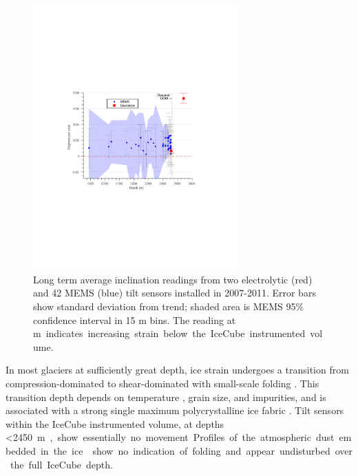 \begin{figure}[!h]
	\centering
    \includegraphics[width=0.7\textwidth]{graphics/geometry/tilt4.pdf}
	\caption{Long term average inclination readings from two electrolytic
      (red) and 42 MEMS (blue) tilt sensors installed in 2007-2011.  Error
      bars show standard deviation from trend; shaded area is MEMS 95\%
      confidence interval in 15 m bins.  The reading at \unit[2540]m
      indicates increasing strain below the IceCube instrumented volume.}
	\label{fig:tilt}
\end{figure}

In most glaciers at sufficiently great depth, ice strain undergoes a
transition from compression-dominated to shear-dominated with small-scale
folding \cite{montagnat14,jansen16}.  This transition depth depends on
temperature \cite{price2002temperature}, grain size, and impurities, and is
associated with a strong single maximum polycrystalline ice fabric
\cite{cuffey10}.  Tilt sensors within the IceCube instrumented volume, at
depths \SI{<2450}m, show essentially no movement.  Profiles of the
atmospheric dust embedded in the ice \cite{I3:dustlogger} show no
indication of folding and appear undisturbed over the full IceCube depth.
